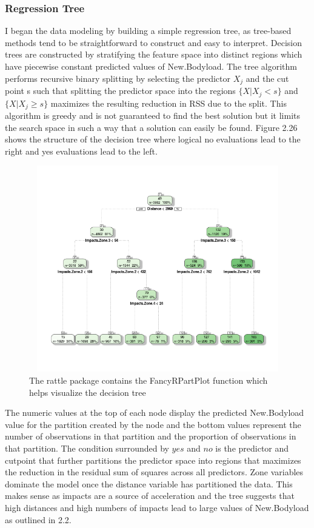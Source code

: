 \subsubsection{Regression Tree}
I began the data modeling by building a simple regression tree, as tree-based methods tend to be straightforward to construct and easy to interpret. Decision trees are constructed by stratifying the feature space into distinct regions which have piecewise constant predicted values of  New.Bodyload. The tree algorithm performs recursive binary splitting by selecting the predictor $X_j$ and the cut point s such that splitting the predictor space into the regions $\{X|X_j < s\}$ and $\{X|X_j \geq s \}$ maximizes the resulting reduction in RSS due to the split. This algorithm is greedy and is not guaranteed to find the best solution but it limits the search space in such a way that a solution can easily be found. Figure 2.26 shows the structure of the decision tree where logical no evaluations lead to the right and yes evaluations lead to the left. 
\begin{figure}[h]
	\centering
	\includegraphics[width=12cm, height=9cm]{Images/DecisionTreeNoOut.png}
	\caption{The rattle package contains the FancyRPartPlot function which helps visualize the decision tree}
\end{figure}
\break\hfill

The numeric values at the top of each node display the predicted New.Bodyload value for the partition created by the node and the bottom values represent the number of observations in that partition and the proportion of observations in that partition. The condition surrounded by $yes$ and $no$ is the predictor and cutpoint that further partitions the predictor space into regions that maximizes the reduction in the residual sum of squares across all predictors. Zone variables dominate the model once the distance variable has partitioned the data. This makes sense as impacts are a source of acceleration and the tree suggests that high distances and high numbers of impacts lead to large values of New.Bodyload as outlined in 2.2.


